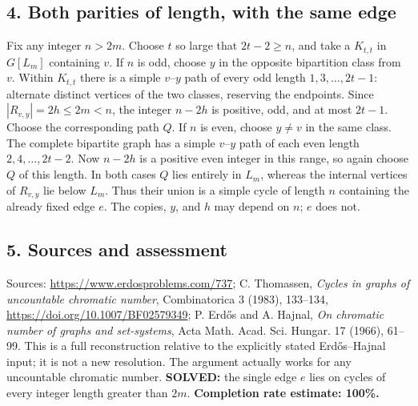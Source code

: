 \subsection*{4. Both parities of length, with the same edge}
Fix any integer $n>2m$. Choose $t$ so large that $2t-2\ge n$, and take a $K_{t,t}$ in $G[L_m]$ containing $v$.
If $n$ is odd, choose $y$ in the opposite bipartition class from $v$. Within $K_{t,t}$ there is a simple $v$--$y$ path of every odd length $1,3,\ldots,2t-1$: alternate distinct vertices of the two classes, reserving the endpoints. Since $|R_{v,y}|=2h\le2m<n$, the integer $n-2h$ is positive, odd, and at most $2t-1$. Choose the corresponding path $Q$.
If $n$ is even, choose $y\ne v$ in the same class. The complete bipartite graph has a simple $v$--$y$ path of each even length $2,4,\ldots,2t-2$. Now $n-2h$ is a positive even integer in this range, so again choose $Q$ of this length.
In both cases $Q$ lies entirely in $L_m$, whereas the internal vertices of $R_{v,y}$ lie below $L_m$. Thus their union is a simple cycle of length $n$ containing the already fixed edge $e$. The copies, $y$, and $h$ may depend on $n$; $e$ does not.
\subsection*{5. Sources and assessment}
Sources: \url{https://www.erdosproblems.com/737}; C. Thomassen, \emph{Cycles in graphs of uncountable chromatic number}, Combinatorica 3 (1983), 133--134, \url{https://doi.org/10.1007/BF02579349}; P. Erd\H{o}s and A. Hajnal, \emph{On chromatic number of graphs and set-systems}, Acta Math. Acad. Sci. Hungar. 17 (1966), 61--99.
This is a full reconstruction relative to the explicitly stated Erd\H{o}s--Hajnal input; it is not a new resolution. The argument actually works for any uncountable chromatic number.
\textbf{SOLVED:} the single edge $e$ lies on cycles of every integer length greater than $2m$.
\textbf{Completion rate estimate: 100\%.}

